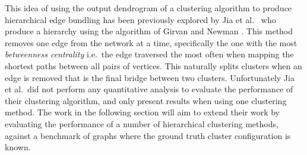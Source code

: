 This idea of using the output dendrogram of a clustering algorithm to produce hierarchical edge bundling has been previously explored by Jia et al.\ \cite{Jia2011} who produce a hierarchy using the algorithm of Girvan and Newman \cite{Girvan2002}. This method removes one edge from the network at a time, specifically the one with the most \emph{betweenness centrality} i.e.\ the edge traversed the most often when mapping the shortest paths between all pairs of vertices. This naturally splits clusters when an edge is removed that is the final bridge between two clusters.
Unfortunately Jia et al.\ did not perform any quantitative analysis to evaluate the performance of their clustering algorithm, and only present results when using one clustering method. The work in the following section will aim to extend their work by evaluating the performance of a number of hierarchical clustering methods, against a benchmark of graphs where the ground truth cluster configuration is known.

